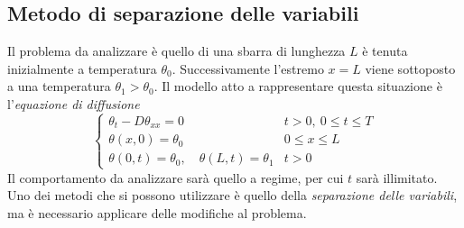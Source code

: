 \documentclass[a4paper,12pt, draft]{article}
\theoremstyle{break}
\numberwithin{equation}{section}
\begin{document}
\subsection{Metodo di separazione delle variabili}
Il problema da analizzare è quello di una sbarra di lunghezza $L$ è tenuta inizialmente a temperatura $\theta_0$. Successivamente l'estremo $x = L$ viene sottoposto a una temperatura $\theta_1 > \theta_0$. Il modello atto a rappresentare questa situazione è l'\emph{equazione di diffusione}
$$
\begin{cases}
\theta_t -D \theta_{xx} = 0 & t > 0,\ 0 \leq t \leq T\\
\theta(x, 0) = \theta_0  & 0 \leq x \leq L\\
\theta(0,t) = \theta_0, \quad \theta(L,t)=\theta_1 & t >0
\end{cases}
$$
Il comportamento da analizzare sarà quello a regime, per cui $t$ sarà illimitato. Uno dei metodi che si possono utilizzare è quello della \emph{separazione delle variabili}, ma è necessario applicare delle modifiche al problema.
\end{document}
